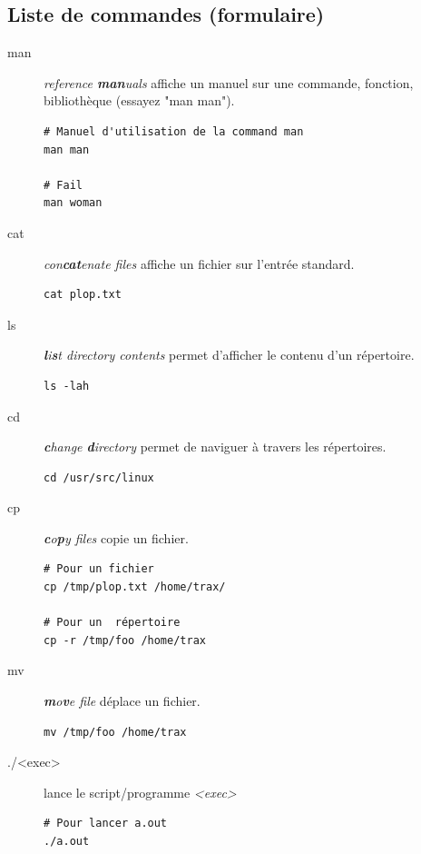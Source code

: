 \documentclass[french, a4paper, 12pt, titlepage]{article}
\begin{document}
\subsection{Liste de commandes (formulaire)}
\begin{description}
\item[man] \emph{reference \textbf{man}uals} affiche un manuel sur une commande, fonction, bibliothèque (essayez "man man").
  \begin{lstlisting}
# Manuel d'utilisation de la command man
man man

# Fail
man woman
  \end{lstlisting}

\item[cat] \emph{con\textbf{cat}enate files} affiche un fichier sur l'entrée standard.
  \begin{lstlisting}
cat plop.txt
  \end{lstlisting}

\item[ls] \emph{\textbf{l}i\textbf{s}t directory contents} permet d'afficher le contenu d'un répertoire.
  \begin{lstlisting}
ls -lah
  \end{lstlisting}

\item[cd] \emph{\textbf{c}hange \textbf{d}irectory} permet de naviguer à travers les répertoires.
  \begin{lstlisting}
cd /usr/src/linux
  \end{lstlisting}

\item[cp] \emph{\textbf{c}o\textbf{p}y files} copie un fichier.
  \begin{lstlisting}
# Pour un fichier
cp /tmp/plop.txt /home/trax/

# Pour un  répertoire
cp -r /tmp/foo /home/trax
  \end{lstlisting}

\item[mv] \emph{\textbf{m}o\textbf{v}e file} déplace un fichier.
  \begin{lstlisting}
mv /tmp/foo /home/trax
  \end{lstlisting}

\item[./<exec>] lance le script/programme \emph{<exec>}
  \begin{lstlisting}
# Pour lancer a.out
./a.out
  \end{lstlisting}
\end{description}
\end{document}
